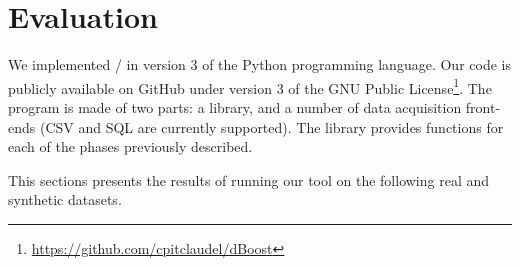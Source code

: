 \section{Evaluation}
\label{sec:evaluation}

We implemented \dBoost/ in version 3 of the Python programming language. Our code is publicly available on GitHub under version 3 of the GNU Public License\footnote{\url{https://github.com/cpitclaudel/dBoost}}. The program is made of two parts: a library, and a number of data acquisition front-ends (CSV and SQL are currently supported). The library provides functions for each of the phases previously described.



%

This sections presents the results of running our tool on the following real and synthetic datasets.


